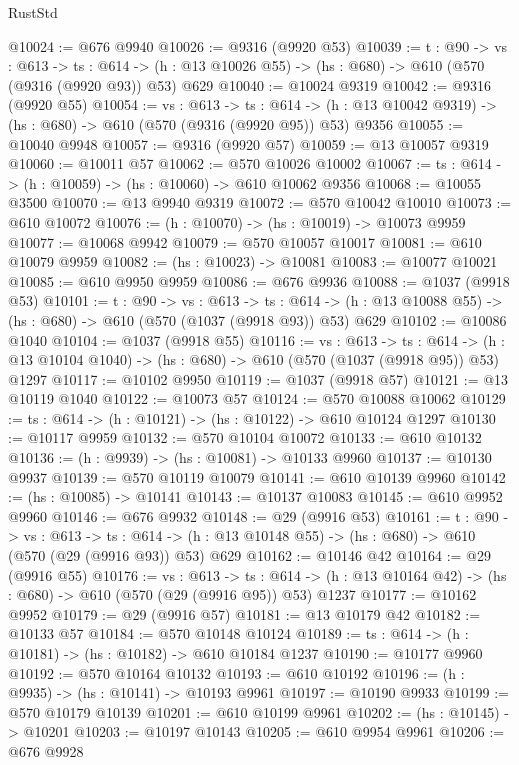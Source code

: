 \begin{lexlean}{RustStd}
\begin{coremodule}
@10024 := @676 @9940
@10026 := @9316 (@9920 @53)
@10039 := {t : @90} ->
  {vs : @613} ->
  {ts : @614} -> (h : @13 @10026 @55) -> (hs : @680) -> @610 (@570 (@9316 (@9920 @93)) @53) @629
@10040 := @10024 @9319
@10042 := @9316 (@9920 @55)
@10054 := {vs : @613} ->
  {ts : @614} -> (h : @13 @10042 @9319) -> (hs : @680) -> @610 (@570 (@9316 (@9920 @95)) @53) @9356
@10055 := @10040 @9948
@10057 := @9316 (@9920 @57)
@10059 := @13 @10057 @9319
@10060 := @10011 @57
@10062 := @570 @10026 @10002
@10067 := {ts : @614} -> (h : @10059) -> (hs : @10060) -> @610 @10062 @9356
@10068 := @10055 @3500
@10070 := @13 @9940 @9319
@10072 := @570 @10042 @10010
@10073 := @610 @10072
@10076 := (h : @10070) -> (hs : @10019) -> @10073 @9959
@10077 := @10068 @9942
@10079 := @570 @10057 @10017
@10081 := @610 @10079 @9959
@10082 := (hs : @10023) -> @10081
@10083 := @10077 @10021
@10085 := @610 @9950 @9959
@10086 := @676 @9936
@10088 := @1037 (@9918 @53)
@10101 := {t : @90} ->
  {vs : @613} ->
  {ts : @614} -> (h : @13 @10088 @55) -> (hs : @680) -> @610 (@570 (@1037 (@9918 @93)) @53) @629
@10102 := @10086 @1040
@10104 := @1037 (@9918 @55)
@10116 := {vs : @613} ->
  {ts : @614} -> (h : @13 @10104 @1040) -> (hs : @680) -> @610 (@570 (@1037 (@9918 @95)) @53) @1297
@10117 := @10102 @9950
@10119 := @1037 (@9918 @57)
@10121 := @13 @10119 @1040
@10122 := @10073 @57
@10124 := @570 @10088 @10062
@10129 := {ts : @614} -> (h : @10121) -> (hs : @10122) -> @610 @10124 @1297
@10130 := @10117 @9959
@10132 := @570 @10104 @10072
@10133 := @610 @10132
@10136 := (h : @9939) -> (hs : @10081) -> @10133 @9960
@10137 := @10130 @9937
@10139 := @570 @10119 @10079
@10141 := @610 @10139 @9960
@10142 := (hs : @10085) -> @10141
@10143 := @10137 @10083
@10145 := @610 @9952 @9960
@10146 := @676 @9932
@10148 := @29 (@9916 @53)
@10161 := {t : @90} ->
  {vs : @613} ->
  {ts : @614} -> (h : @13 @10148 @55) -> (hs : @680) -> @610 (@570 (@29 (@9916 @93)) @53) @629
@10162 := @10146 @42
@10164 := @29 (@9916 @55)
@10176 := {vs : @613} ->
  {ts : @614} -> (h : @13 @10164 @42) -> (hs : @680) -> @610 (@570 (@29 (@9916 @95)) @53) @1237
@10177 := @10162 @9952
@10179 := @29 (@9916 @57)
@10181 := @13 @10179 @42
@10182 := @10133 @57
@10184 := @570 @10148 @10124
@10189 := {ts : @614} -> (h : @10181) -> (hs : @10182) -> @610 @10184 @1237
@10190 := @10177 @9960
@10192 := @570 @10164 @10132
@10193 := @610 @10192
@10196 := (h : @9935) -> (hs : @10141) -> @10193 @9961
@10197 := @10190 @9933
@10199 := @570 @10179 @10139
@10201 := @610 @10199 @9961
@10202 := (hs : @10145) -> @10201
@10203 := @10197 @10143
@10205 := @610 @9954 @9961
@10206 := @676 @9928

\end{coremodule}
\end{lexlean}
